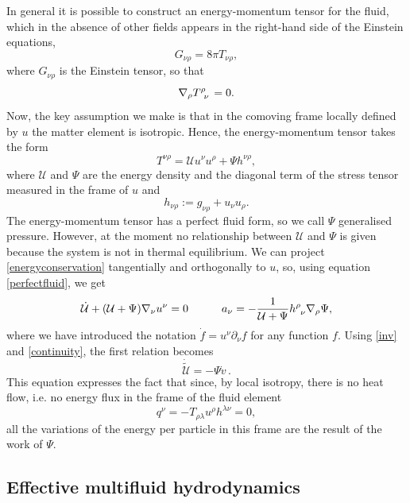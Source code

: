 \documentclass[useAMS,usenatbib,prd,twocolumn,nofootinbib]{revtex4-1}
\newcommand{\spc}{\quad \quad \quad}
\begin{document}
In general it is possible to construct an energy-momentum tensor for the fluid, which in the absence of other fields appears in the right-hand side of the Einstein equations,
\begin{equation}
G_{\nu \rho} = 8\pi T_{\nu \rho},
\end{equation}
where $G_{\nu \rho}$ is the Einstein tensor, so that
\begin{equation}\label{energyconservation}
\nabla_\rho T\indices{^\rho _\nu} =0.
\end{equation}
Now, the key assumption we make is that in the comoving frame locally defined by $u$ the matter element is isotropic. Hence, the energy-momentum tensor takes the form
\begin{equation}\label{perfectfluid}
T^{\nu \rho} = \mathcal{U} u^\nu u^\rho + \Psi h^{\nu \rho},
\end{equation}
where $\mathcal{U}$ and $\Psi$ are the energy density and the diagonal term of the stress tensor measured in the frame of $u$ and
\begin{equation}
h_{\nu \rho} := g_{\nu \rho} + u_\nu  u_\rho .
\end{equation}
The energy-momentum tensor has a perfect fluid form, so we call $\Psi$ generalised pressure. 
However,  at the moment no relationship between $\mathcal{U}$ and $\Psi$ is given because the system is not in thermal equilibrium. We can project \eqref{energyconservation} tangentially and orthogonally to $u$, so, using equation \eqref{perfectfluid}, we get
\begin{equation}
 \dot{\mathcal{U}} + (\mathcal{U} + \Psi)\nabla_\nu u^\nu =0 \spc a_\nu = - \dfrac{1}{\mathcal{U} + \Psi} h\indices{^\rho _\nu} \nabla_\rho \Psi , 
\end{equation}
where we have introduced the notation $\dot{f}=u^\nu \partial_\nu f$ for any function $f$. 
Using \eqref{inv} and  \eqref{continuity}, the first relation becomes
\begin{equation}\label{comparison}
\dot{\tilde{\mathcal{U}}} = -\Psi \dot{v} \, .
\end{equation}
This equation expresses the fact that since, by local isotropy, there is no heat flow, i.e. no energy flux in the frame of the fluid element
\begin{equation}
q^\nu = - T_{\rho \lambda} u^\rho h^{\lambda \nu} =0,
\end{equation}
all the variations of the energy per particle in this frame are the result of the work of $\Psi$.

\subsection{Effective multifluid hydrodynamics}\label{Aouoeee}
\end{document}
